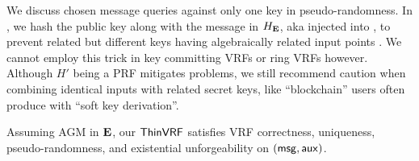 
We discuss chosen message queries against only one key in pseudo-randomness.  
In \ThinVRF, we hash the public key \pk along with the message \msg
in $H_{\mathbf{E}}$, aka injected \pk into \msg, to prevent
related but different keys having algebraically related input points \In.
We cannot employ this trick in key committing VRFs or ring VRFs however.
Although $H'$ being a PRF mitigates problems, we still recommend caution 
when combining identical inputs \msg with related secret keys,
 like ``blockchain'' users often produce with ``soft key derivation''.

\begin{proposition}\label{prop:thin_vrf}
Assuming AGM in ${\mathbf{E}}$, %
our $\ThinVRF$ satisfies
 VRF correctness, uniqueness, pseudo-randomness,
 and existential unforgeability on $(\msg,\aux)$.
\end{proposition}



\endinput







\begin{proof}[Proof sketch]
	TODO: ???
\end{proof}
















We expect $\ThinVRF$ to be an EUF-CMA signature scheme on $(\msg,\aux)$ too,
but proving this requires techniques outside our scope, even assuming AGM.

